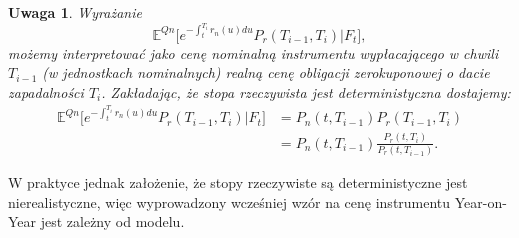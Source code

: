 \documentclass{mini}
\theoremstyle{mythstyle}
\newtheorem{Uwaga}{Uwaga}[chapter]
\begin{document}
\begin{Uwaga}
		Wyrażanie 
			\begin{equation*}
		\mathbb{E}^{Qn} \bigg[ e^{-\int_t^{T_i}r_n(u)du} P_r(T_{i-1},T_i) \bigg| F_t \bigg],
		\end{equation*}
		możemy interpretować jako cenę nominalną instrumentu wypłacającego w chwili $T_{i-1}$ (w jednostkach nominalnych) realną cenę obligacji zerokuponowej o dacie zapadalności $T_i$. Zakładając, że stopa rzeczywista jest deterministyczna dostajemy:
	\begin{align}
	\mathbb{E}^{Qn} \bigg[ e^{-\int_t^{T_i}r_n(u)du} P_r(T_{i-1},T_i) \bigg| F_t \bigg] &= P_n(t,T_{i-1})P_r(T_{i-1},T_i)\\
	&= P_n(t,T_{i-1})\frac{P_r(t,T_i)}{P_r(t,T_{i-1})}.
		\end{align}	
\end{Uwaga}
	W praktyce jednak założenie, że stopy rzeczywiste są deterministyczne jest nierealistyczne, więc wyprowadzony wcześniej wzór na cenę instrumentu Year-on-Year jest zależny od modelu.
\end{document}
